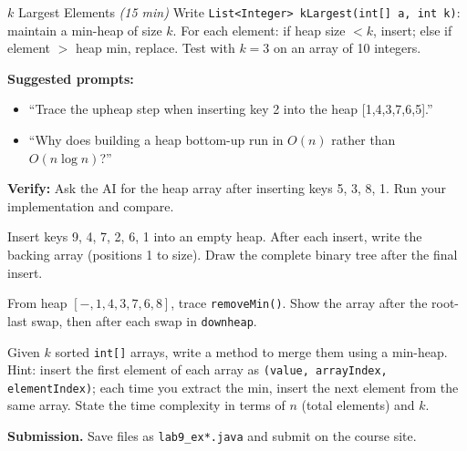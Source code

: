 \documentclass[11pt]{article}
\begin{document}
\begin{labexercise}{$k$ Largest Elements \hfill {\small \itshape (15 min)}}
Write \texttt{List<Integer> kLargest(int[] a, int k)}: maintain a min-heap of size $k$.
For each element: if heap size $< k$, insert; else if element $>$ heap min, replace.
Test with $k=3$ on an array of 10 integers.
\end{labexercise}

\begin{aicollab}
\textbf{Suggested prompts:}
\begin{itemize}[leftmargin=*,nosep]
  \item ``Trace the upheap step when inserting key 2 into the heap [1,4,3,7,6,5].''
  \item ``Why does building a heap bottom-up run in $O(n)$ rather than $O(n \log n)$?''
\end{itemize}
\medskip\textbf{Verify:} Ask the AI for the heap array after inserting keys 5, 3, 8, 1.
Run your implementation and compare.
\end{aicollab}

\takehomebanner

\begin{trace}
Insert keys 9, 4, 7, 2, 6, 1 into an empty heap.
After each insert, write the backing array (positions 1 to size).
Draw the complete binary tree after the final insert.
\end{trace}

\begin{trace}
From heap $[-, 1, 4, 3, 7, 6, 8]$, trace \texttt{removeMin()}.
Show the array after the root-last swap, then after each swap in \texttt{downheap}.
\end{trace}

\begin{writecode}
Given $k$ sorted \texttt{int[]} arrays, write a method to merge them using a min-heap.
Hint: insert the first element of each array as \texttt{(value, arrayIndex, elementIndex)};
each time you extract the min, insert the next element from the same array.
State the time complexity in terms of $n$ (total elements) and $k$.
\end{writecode}

\vspace{4pt}
\noindent\textbf{Submission.} Save files as \texttt{lab9\_ex*.java} and submit on the course site.
\end{document}
